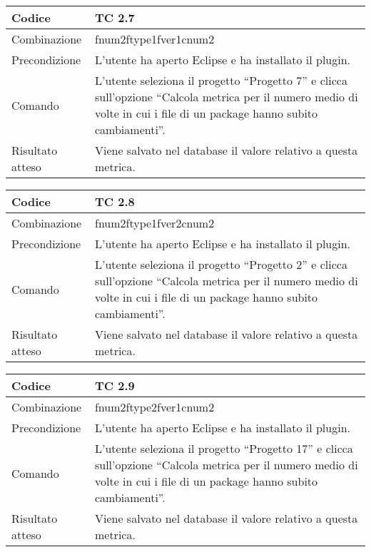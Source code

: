 \begin{table}[ht]
\begin{tabular}{|p{3cm}|p{9cm}|}
\hline
\cellcolor{lightgray}Codice				& TC 2.7								\\
\hline
\cellcolor{lightgray}Combinazione		& fnum2ftype1fver1cnum2									\\
\hline
\cellcolor{lightgray}Precondizione		& L'utente ha aperto Eclipse e ha installato il plugin.		\\
\hline
\cellcolor{lightgray}Comando			& L'utente seleziona il progetto ``Progetto 7''  e clicca sull'opzione ``Calcola metrica per il numero medio di volte in cui i file di un package hanno subito cambiamenti''.	\\
\hline
\cellcolor{lightgray}Risultato atteso	& Viene salvato nel database il valore relativo a questa metrica.\\
\hline
\end{tabular}
\end{table}

\begin{table}[ht]
\begin{tabular}{|p{3cm}|p{9cm}|}
\hline
\cellcolor{lightgray}Codice				& TC 2.8								\\
\hline
\cellcolor{lightgray}Combinazione		& fnum2ftype1fver2cnum2										\\
\hline
\cellcolor{lightgray}Precondizione		& L'utente ha aperto Eclipse e ha installato il plugin.		\\
\hline
\cellcolor{lightgray}Comando			& L'utente seleziona il progetto ``Progetto 2''  e clicca sull'opzione ``Calcola metrica per il numero medio di volte in cui i file di un package hanno subito cambiamenti''.	\\
\hline
\cellcolor{lightgray}Risultato atteso	& Viene salvato nel database il valore relativo a questa metrica.\\
\hline
\end{tabular}
\end{table}

\begin{table}[ht]
\begin{tabular}{|p{3cm}|p{9cm}|}
\hline
\cellcolor{lightgray}Codice				& TC 2.9								\\
\hline
\cellcolor{lightgray}Combinazione		& fnum2ftype2fver1cnum2									\\
\hline
\cellcolor{lightgray}Precondizione		& L'utente ha aperto Eclipse e ha installato il plugin.		\\
\hline
\cellcolor{lightgray}Comando			& L'utente seleziona il progetto ``Progetto 17''  e clicca sull'opzione ``Calcola metrica per il numero medio di volte in cui i file di un package hanno subito cambiamenti''.	\\
\hline
\cellcolor{lightgray}Risultato atteso	& Viene salvato nel database il valore relativo a questa metrica.\\
\hline
\end{tabular}
\end{table}

